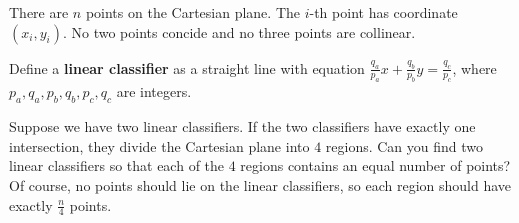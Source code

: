 There are $n$ points on the Cartesian plane.
The $i$-th point has coordinate $(x_i,y_i)$.
No two points concide and no three points are collinear.

Define a \textbf{linear classifier} as a straight line with equation $\frac{q_a}{p_a} x + \frac{q_b}{p_b} y = \frac{q_c}{p_c}$, where $p_a,q_a,p_b,q_b,p_c,q_c$ are integers. 

Suppose we have two linear classifiers.
If the two classifiers have exactly one intersection, they divide the Cartesian plane into $4$ regions.
Can you find two linear classifiers so that each of the $4$ regions contains an equal number of points?
Of course, no points should lie on the linear classifiers, so each region should have exactly $\frac{n}{4}$ points. 
